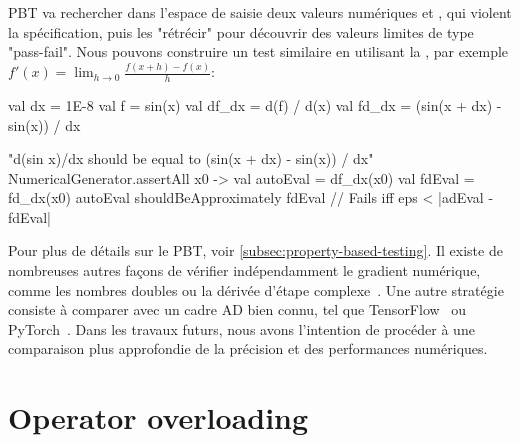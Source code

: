 %
PBT va rechercher dans l'espace de saisie deux valeurs numériques  et , qui violent la spécification, puis les "rétrécir" pour découvrir des valeurs limites de type "pass-fail". Nous pouvons construire un test similaire en utilisant la , par exemple $f'(x)=\lim _{h\to 0}{\frac {f(x+h)-f(x)}{h}}$:
%
\begin{kotlinlisting}
val dx = 1E-8
val f = sin(x)
val df_dx = d(f) / d(x)
val fd_dx = (sin(x + dx) - sin(x)) / dx

"d(sin x)/dx should be equal to (sin(x + dx) - sin(x)) / dx" {
    NumericalGenerator.assertAll { x0 ->
    val autoEval = df_dx(x0)
        val fdEval = fd_dx(x0)
        autoEval shouldBeApproximately fdEval // Fails iff eps < |adEval - fdEval|
    }
}
\end{kotlinlisting}
%
Pour plus de détails sur le PBT, voir \autoref{subsec:property-based-testing}. Il existe de nombreuses autres façons de vérifier indépendamment le gradient numérique, comme les nombres doubles ou la dérivée d'étape complexe~\citep{martins2003complex}. Une autre stratégie consiste à comparer avec un cadre AD bien connu, tel que TensorFlow~\citep{abadi2016tensorflow} ou PyTorch~\citep{paszke2019pytorch}. Dans les travaux futurs, nous avons l'intention de procéder à une comparaison plus approfondie de la précision et des performances numériques.

\section{Operator overloading}\label{sec:operator-overloading}

